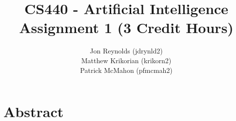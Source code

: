 \documentclass[titlepage]{article}
\title{CS440 - Artificial Intelligence \\ Assignment 1 (3 Credit Hours)}
\author{Jon Reynolds (jdrynld2) \\ Matthew Krikorian (krikorn2) \\ Patrick McMahon (pfmcmah2)}
\begin{document}
\maketitle

\section{Abstract}
\end{document}
